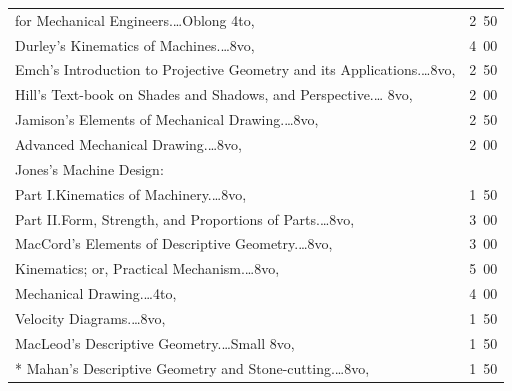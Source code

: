 \documentclass[a4paper,12pt]{book}[2004/02/16]
\theoremstyle{ilemma}
\theoremstyle{itheorem}
\theoremstyle{iother}
\theoremstyle{icorollary}
\theoremstyle{numcorollary}
\theoremstyle{idefinition}
\begin{document}
\begin{longtable}{@{}l@{ }r@{}}
\nopagebreak

\indent\indent for Mechanical Engineers.\dotfill\ldots Oblong 4to, &2\ 50\\

Durley's Kinematics of Machines.\dotfill\ldots 8vo, &4\ 00\\

Emch's Introduction to Projective Geometry and its
Applications.\dotfill\ldots 8vo, &2\ 50\\

Hill's Text-book on Shades and Shadows, and Perspective.\dotfill\ldots
8vo, &2\ 00\\

Jamison's Elements of Mechanical Drawing.\dotfill\ldots 8vo, &2\ 50\\

\nopagebreak

\indent Advanced Mechanical Drawing.\dotfill\ldots 8vo, &2\ 00\\

Jones's Machine Design:\\

\nopagebreak

\indent Part I.\quad Kinematics of Machinery.\dotfill\ldots 8vo, &1\ 50\\

\nopagebreak

\indent Part II.\quad Form, Strength, and Proportions of
Parts.\dotfill\ldots 8vo, &3\ 00\\

MacCord's Elements of Descriptive Geometry.\dotfill\ldots 8vo, &3\ 00\\

\nopagebreak

\indent Kinematics; or, Practical Mechanism.\dotfill\ldots 8vo, &5\ 00\\

\nopagebreak

\indent Mechanical Drawing.\dotfill\ldots 4to, &4\ 00\\

\nopagebreak

\indent Velocity Diagrams.\dotfill\ldots 8vo, &1\ 50\\

MacLeod's Descriptive Geometry.\dotfill\ldots Small 8vo, &1\ 50\\

* Mahan's Descriptive Geometry and Stone-cutting.\dotfill\ldots 8vo,
  &1\ 50\\


\end{longtable}
\end{document}

